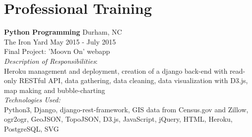 \documentclass[10pt]{article}
\begin{document}
\section*{Professional Training}

{\bf Python Programming} \hfill Durham, NC\\
The Iron Yard \hfill {May 2015 - July 2015}
\vspace{5pt}\\
Final Project: 'Moovn On' webapp\\
{\it Description of Responsibilities}:\\
Heroku management and deployment, creation of a django back-end with read-only RESTful API, data gathering, data cleaning, data visualization with D3.js, map making and bubble-charting\\
{\it Technologies Used:}\\
Python3, Django, django-rest-framework, GIS data from Census.gov and Zillow, ogr2ogr, GeoJSON, TopoJSON, D3.js, JavaScript, jQuery, HTML, Heroku, PostgreSQL, SVG

\end{document}

